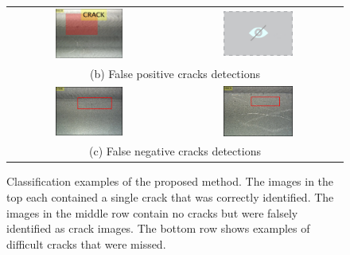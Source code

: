 \begin{figure}
{\begin{tabular}{cc}
                    \includegraphics[width=0.43\textwidth,height=0.20\textheight]{Images/FPCrack3.png} &
                    \includegraphics[width=0.43\textwidth,height=0.20\textheight]{Images/NoVisualHolder.png} \\
                    \multicolumn{2}{c}{(b) False positive cracks detections} \\
                    
                    \includegraphics[width=0.43\textwidth,height=0.20\textheight]{Images/FNCrack3.png} & 
                    \includegraphics[width=0.43\textwidth,height=0.20\textheight]{Images/FNCrack4.png} \\
                    \multicolumn{2}{c}{(c) False negative cracks detections}
            \end{tabular}
            }
        
        
        \caption{Classification examples of the proposed method. The images in the top each contained a single crack that was correctly identified. The images in the middle row contain no cracks but were falsely identified as crack images. The bottom row shows examples of difficult cracks that were missed.}
        \label{fig:FigExample}
        
    \end{figure}
    
